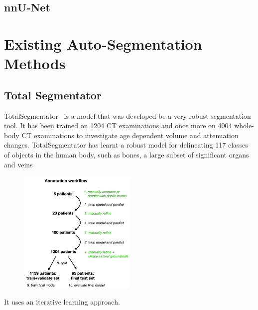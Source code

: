 \documentclass[11pt,twoside]{report}
\begin{document}


\subsection{nnU-Net}\label{sect:nnu-net}

\section{Existing Auto-Segmentation Methods}\label{sect:existing-auto-segmentation-methods}

\subsection{Total Segmentator}\label{sect:totalseg}

TotalSegmentator~\cite{totalsegmentor-paper} is a model that was developed be a very robust segmentation tool. It has been trained on 1204 CT examinations and once more on 4004 whole-body CT examinations to investigate age dependent volume and attenuation changes. TotalSegmentator has learnt a robust model for delineating 117 classes of objects in the human body, such as bones, a large subset of significant organs and veins~\cite{totalsegmentor-git}

\begin{figure}
  \centering
  \includegraphics*[width=0.5\textwidth]{../figures/AnnotationWorkflow.png}
\end{figure} 

It uses an iterative learning approach.
\end{document}

